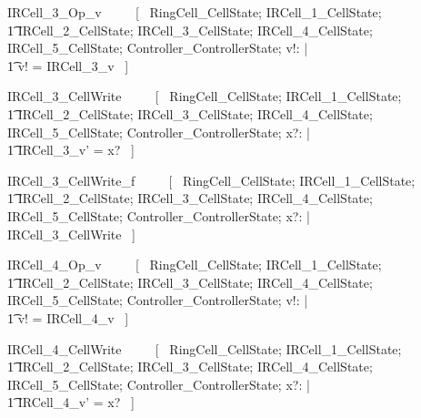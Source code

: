 \documentclass{article}
\begin{document}
\begin{zed}
IRCell\_3\_Op\_v ~~~~ [~ 
    \Xi RingCell\_CellState; 
    \Xi IRCell\_1\_CellState; \\
    \t1 \Xi IRCell\_2\_CellState; 
    \Xi IRCell\_3\_CellState;
    \Xi IRCell\_4\_CellState; 
    \Xi IRCell\_5\_CellState; 
    \Xi Controller\_ControllerState; v!: \nat | \\
    \t1 v! = IRCell\_3\_v ~] \\
\end{zed}

\begin{zed}
IRCell\_3\_CellWrite ~~~~ [~ 
    \Xi RingCell\_CellState; 
    \Xi IRCell\_1\_CellState; \\
    \t1 \Xi IRCell\_2\_CellState; 
    \Delta IRCell\_3\_CellState;
    \Xi IRCell\_4\_CellState; 
    \Xi IRCell\_5\_CellState; 
    \Xi Controller\_ControllerState; 
    x?: \nat | \\
    \t1 IRCell\_3\_v' = x? ~] \\
\end{zed}

\begin{zed}
IRCell\_3\_CellWrite\_f ~~~~ [~ 
    \Xi RingCell\_CellState; 
    \Xi IRCell\_1\_CellState; \\
    \t1 \Xi IRCell\_2\_CellState; 
    \Xi IRCell\_3\_CellState;
    \Xi IRCell\_4\_CellState; 
    \Xi IRCell\_5\_CellState; 
    \Xi Controller\_ControllerState; 
    x?: \nat | \\
    \lnot \pre IRCell\_3\_CellWrite ~] \\
\end{zed}
\begin{zed}
IRCell\_4\_Op\_v ~~~~ [~ 
    \Xi RingCell\_CellState; 
    \Xi IRCell\_1\_CellState; \\
    \t1 \Xi IRCell\_2\_CellState; 
    \Xi IRCell\_3\_CellState;
    \Xi IRCell\_4\_CellState; 
    \Xi IRCell\_5\_CellState; 
    \Xi Controller\_ControllerState; v!: \nat | \\
    \t1 v! = IRCell\_4\_v ~] \\
\end{zed}

\begin{zed}
IRCell\_4\_CellWrite ~~~~ [~ 
    \Xi RingCell\_CellState; 
    \Xi IRCell\_1\_CellState; \\
    \t1 \Xi IRCell\_2\_CellState; 
    \Xi IRCell\_3\_CellState; 
    \Delta IRCell\_4\_CellState;
    \Xi IRCell\_5\_CellState; 
    \Xi Controller\_ControllerState; 
    x?: \nat | \\
    \t1 IRCell\_4\_v' = x? ~] \\
\end{zed}
\end{document}
